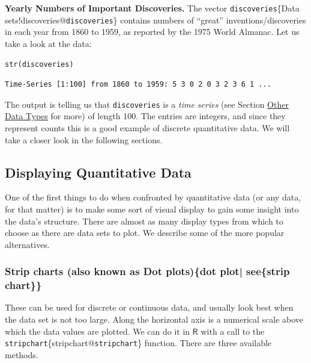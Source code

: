 \documentclass[10pt,english]{scrbook}
\begin{document}
\begin{exampletoo}

\textbf{Yearly Numbers of Important Discoveries.} The vector \texttt{discoveries}\index\{Data sets!discoveries@\texttt{discoveries}\} contains numbers of “great” inventions/discoveries in each year from 1860 to 1959, as reported by the 1975 World Almanac. Let us take a look at the data:

\begin{verbatim}
str(discoveries)
\end{verbatim}

\begin{verbatim}
Time-Series [1:100] from 1860 to 1959: 5 3 0 2 0 3 2 3 6 1 ...
\end{verbatim}

\end{exampletoo}

The output is telling us that \texttt{discoveries} is a \emph{time series} (see Section \href{data-description}{Other Data Types} for more) of length 100. The entries are integers, and since they represent counts this is a good example of discrete quantitative data. We will take a closer look in the following sections.
\subsection[Displaying Quantitative Data]{Displaying Quantitative Data}
\label{sec-1-1-2}

One of the first things to do when confronted by quantitative data (or any data, for that matter) is to make some sort of visual display to gain some insight into the data's structure. There are almost as many display types from which to choose as there are data sets to plot. We describe some of the more popular alternatives. 

\subsubsection[Strip charts\index{strip chart} (also known as Dot plots)\index\{dot plot| see\{strip chart\}\}]{Strip charts (also known as Dot plots)\index\{dot plot| see\{strip chart\}\}}
\label{sec-1-1-2-1}

These can be used for discrete or continuous data, and usually look best when the data set is not too large. Along the horizontal axis is a numerical scale above which the data values are plotted. We can do it in \(\mathsf{R}\) with a call to the \texttt{stripchart}\index\{stripchart@\texttt{stripchart}\} function. There are three available methods.
\end{document}
